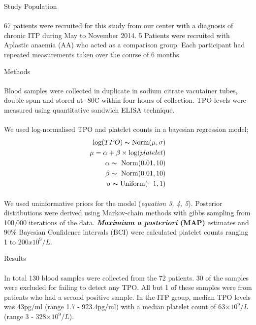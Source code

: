 \documentclass[landscape,a0paper,fontscale=0.285]{beamer} %
\newlength{\onecolwid}
\begin{document}
\begin{frame}[t]
\begin{columns}[t]
\begin{column}{\onecolwid}
\begin{block}{Study Population}
\paragraph{} 67 patients were recruited for this study from our center with a diagnosis of chronic ITP during May to November 2014. 5 Patients were recruited with Aplastic anaemia (AA) who acted as a comparison group. Each participant had repeated measurements taken over the course of 6 months.  



\end{block}

\begin{block}{Methods}
\paragraph{}Blood samples were collected in duplicate in sodium citrate vacutainer tubes, double spun and stored at -80\textdegree C within four hours of collection. TPO levels were measured using quantitative sandwich ELISA technique.
\paragraph{} We used log-normalised TPO and platelet counts in a bayesian regression model;
\begin{align}
    \log(TPO) \thicksim \text{Norm}(\mu, \sigma) \\
    \mu = \alpha + \beta\times \log(platelet) \\
    \alpha \thicksim\ \text{Norm}(0.01, 10) \\
    \beta \thicksim\ \text{Norm}(0.01, 10) \\
    \sigma \thicksim \text{Uniform}(-1, 1)
\end{align}
\paragraph{} We used uninformative priors for the model (\textit{equation 3, 4, 5}). Posterior distributions were derived using Markov-chain methods with gibbs sampling from 100,000 iterations of the data. \textbf{\textit{Maximium a posteriori} (MAP)} estimates and 90\% Bayesian Confidence intervals (BCI) were calculated platelet counts ranging 1 to 200$x10^9/L$. 
\end{block}

\begin{block}{Results}
\paragraph{} In total 130 blood samples were collected from the 72 patients. 30 of the samples were excluded for failing to detect any TPO. All but 1 of these samples were from patients who had a second positive sample. In the ITP group, median TPO levels was 43pg/ml (range 1.7 - 923.4pg/ml) with a median platelet count of 63$\times 10^9/L$ (range 3 - 328$\times 10^9/L$). 
\end{block}


\end{column}
\end{columns}
\end{frame}
\end{document}
